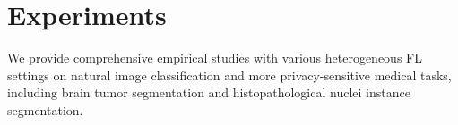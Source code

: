 \documentclass[letterpaper]{article} %
\newcommand{\cmark}{\ding{51}}%
\newcommand{\xmark}{\ding{55}}%
\begin{document}
\section{Experiments}
We provide comprehensive empirical studies with various heterogeneous FL settings on natural image classification and more privacy-sensitive medical tasks, including brain tumor segmentation and histopathological nuclei instance segmentation.


\end{document}
